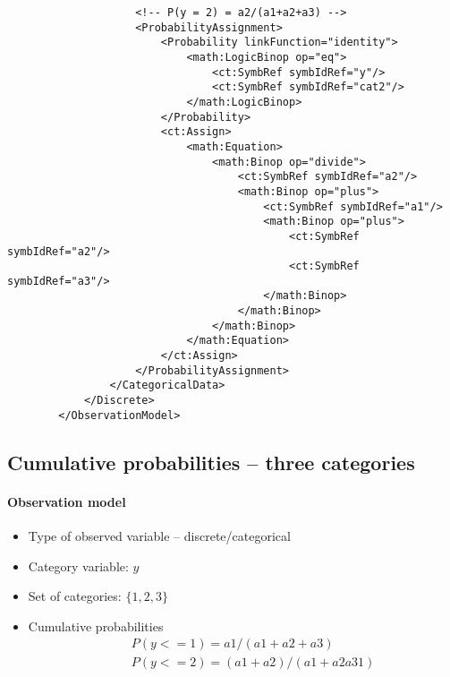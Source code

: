 \begin{lstlisting}
                    <!-- P(y = 2) = a2/(a1+a2+a3) -->
                    <ProbabilityAssignment>
                        <Probability linkFunction="identity"> 
                            <math:LogicBinop op="eq">
                                <ct:SymbRef symbIdRef="y"/>
                                <ct:SymbRef symbIdRef="cat2"/>
                            </math:LogicBinop>
                        </Probability>
                        <ct:Assign>
                            <math:Equation>
                                <math:Binop op="divide">
                                    <ct:SymbRef symbIdRef="a2"/>
                                    <math:Binop op="plus">
                                        <ct:SymbRef symbIdRef="a1"/>
                                        <math:Binop op="plus">
                                            <ct:SymbRef symbIdRef="a2"/>
                                            <ct:SymbRef symbIdRef="a3"/>
                                        </math:Binop>
                                    </math:Binop>
                                </math:Binop>
                            </math:Equation>
                        </ct:Assign>
                    </ProbabilityAssignment>
                </CategoricalData>
            </Discrete>
        </ObservationModel>
\end{lstlisting}


\subsection{Cumulative probabilities -- three categories}

\paragraph{Observation model}

\begin{itemize}
\item
Type of observed variable -- discrete/categorical
\item
Category variable: $y$
\item
Set of categories: $\{1,2,3\}$
\item
Cumulative probabilities
\begin{eqnarray}
&& P(y<=1) = a1/(a1+a2+a3) \nonumber \\
&& P(y<=2) = (a1+a2)/(a1+a2a31)  \nonumber 
\end{eqnarray}
\end{itemize}


